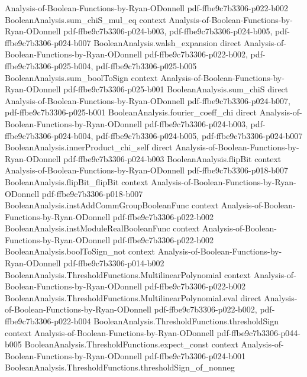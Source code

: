 \begin{lemma}
  {Analysis-of-Boolean-Functions-by-Ryan-ODonnell}
  {pdf-ffbe9c7b3306-p022-b002}
\proofstep
  {BooleanAnalysis.sum_chiS_mul_eq}
  {context}
  {Analysis-of-Boolean-Functions-by-Ryan-ODonnell}
  {pdf-ffbe9c7b3306-p024-b003,
    pdf-ffbe9c7b3306-p024-b005,
    pdf-ffbe9c7b3306-p024-b007}
\proofstep
  {BooleanAnalysis.walsh_expansion}
  {direct}
  {Analysis-of-Boolean-Functions-by-Ryan-ODonnell}
  {pdf-ffbe9c7b3306-p022-b002,
    pdf-ffbe9c7b3306-p025-b004,
    pdf-ffbe9c7b3306-p025-b005}
\proofstep
  {BooleanAnalysis.sum_boolToSign}
  {context}
  {Analysis-of-Boolean-Functions-by-Ryan-ODonnell}
  {pdf-ffbe9c7b3306-p025-b001}
\proofstep
  {BooleanAnalysis.sum_chiS}
  {direct}
  {Analysis-of-Boolean-Functions-by-Ryan-ODonnell}
  {pdf-ffbe9c7b3306-p024-b007,
    pdf-ffbe9c7b3306-p025-b001}
\proofstep
  {BooleanAnalysis.fourier_coeff_chi}
  {direct}
  {Analysis-of-Boolean-Functions-by-Ryan-ODonnell}
  {pdf-ffbe9c7b3306-p024-b003,
    pdf-ffbe9c7b3306-p024-b004,
    pdf-ffbe9c7b3306-p024-b005,
    pdf-ffbe9c7b3306-p024-b007}
\proofstep
  {BooleanAnalysis.innerProduct_chi_self}
  {direct}
  {Analysis-of-Boolean-Functions-by-Ryan-ODonnell}
  {pdf-ffbe9c7b3306-p024-b003}
\proofstep
  {BooleanAnalysis.flipBit}
  {context}
  {Analysis-of-Boolean-Functions-by-Ryan-ODonnell}
  {pdf-ffbe9c7b3306-p018-b007}
\proofstep
  {BooleanAnalysis.flipBit_flipBit}
  {context}
  {Analysis-of-Boolean-Functions-by-Ryan-ODonnell}
  {pdf-ffbe9c7b3306-p018-b007}
\proofstep
  {BooleanAnalysis.instAddCommGroupBooleanFunc}
  {context}
  {Analysis-of-Boolean-Functions-by-Ryan-ODonnell}
  {pdf-ffbe9c7b3306-p022-b002}
\proofstep
  {BooleanAnalysis.instModuleRealBooleanFunc}
  {context}
  {Analysis-of-Boolean-Functions-by-Ryan-ODonnell}
  {pdf-ffbe9c7b3306-p022-b002}
\proofstep
  {BooleanAnalysis.boolToSign_not}
  {context}
  {Analysis-of-Boolean-Functions-by-Ryan-ODonnell}
  {pdf-ffbe9c7b3306-p014-b002}
\proofstep
  {BooleanAnalysis.ThresholdFunctions.MultilinearPolynomial}
  {context}
  {Analysis-of-Boolean-Functions-by-Ryan-ODonnell}
  {pdf-ffbe9c7b3306-p022-b002}
\proofstep
  {BooleanAnalysis.ThresholdFunctions.MultilinearPolynomial.eval}
  {direct}
  {Analysis-of-Boolean-Functions-by-Ryan-ODonnell}
  {pdf-ffbe9c7b3306-p022-b002,
    pdf-ffbe9c7b3306-p022-b004}
\proofstep
  {BooleanAnalysis.ThresholdFunctions.thresholdSign}
  {context}
  {Analysis-of-Boolean-Functions-by-Ryan-ODonnell}
  {pdf-ffbe9c7b3306-p044-b005}
\proofstep
  {BooleanAnalysis.ThresholdFunctions.expect_const}
  {context}
  {Analysis-of-Boolean-Functions-by-Ryan-ODonnell}
  {pdf-ffbe9c7b3306-p024-b001}
\proofstep
  {BooleanAnalysis.ThresholdFunctions.thresholdSign_of_nonneg}

\end{lemma}
